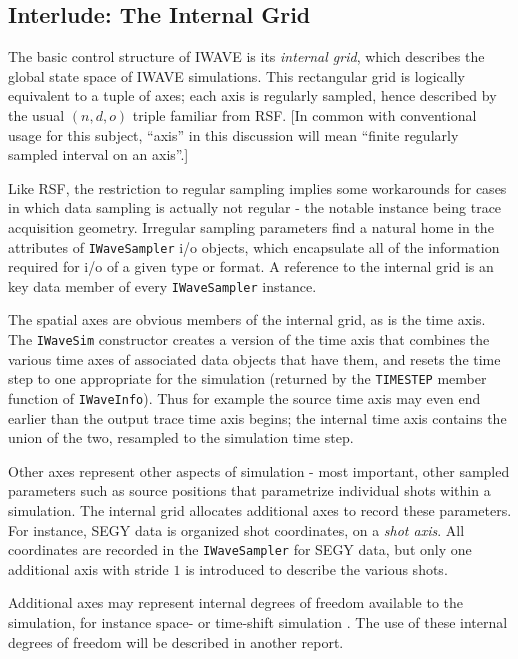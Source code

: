 \subsection{Interlude: The Internal Grid}

The basic control structure of IWAVE is its {\em internal grid}, which
describes the global state space of IWAVE simulations. This
rectangular grid is logically equivalent to a tuple of axes; each axis
is regularly sampled, hence described by the usual $(n,d,o)$ triple
familiar from RSF. [In common with conventional usage for this
subject, ``axis'' in this discussion will mean ``finite regularly
sampled interval on an axis''.]

Like RSF, the restriction to regular sampling implies some workarounds
for cases in which data sampling is actually not regular - the notable
instance being trace acquisition geometry. Irregular
sampling parameters find a natural home in the attributes of {\tt IWaveSampler}
i/o objects, which encapsulate all of the information required for i/o
of a given type or format. A reference to the internal grid is an key data member of
every {\tt IWaveSampler} instance.

The spatial axes are obvious members of the internal grid, as is the
time axis. The {\tt IWaveSim} constructor creates a version of the
time axis that combines the various time axes of associated data
objects that have them, and resets the time step to one appropriate
for the simulation (returned by the {\tt TIMESTEP} member function of
{\tt IWaveInfo}). Thus for example the source time axis may even
end earlier than the output trace time axis begins; the internal time
axis contains the union of the two, resampled to the simulation time
step.

Other axes represent other aspects of simulation - most important,
other sampled parameters such as source positions that parametrize
individual shots within a simulation. The internal grid allocates
additional axes to record these parameters. For instance, SEGY data is
organized shot coordinates, on a {\em shot axis}. All coordinates are
recorded in the {\tt IWaveSampler} for SEGY data, but only one
additional axis with stride $1$ is introduced to describe the various
shots.

Additional axes may represent internal degrees of freedom available to
the simulation, for instance space- or time-shift simulation \cite[]{geoprosp:2008}. The use of these internal degrees of freedom will be described
in another report.

